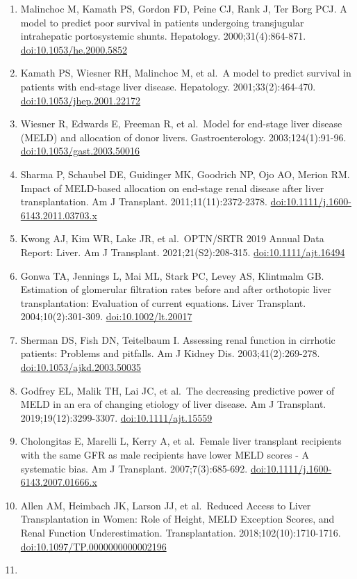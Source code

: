 \documentclass[11pt,english,]{book} %
\begin{document}
\begin{enumerate}
\item
  Malinchoc M, Kamath PS, Gordon FD, Peine CJ, Rank J, Ter Borg PCJ. A model to predict poor survival in patients undergoing transjugular intrahepatic portosystemic shunts. Hepatology. 2000;31(4):864-871. \url{doi:10.1053/he.2000.5852}
\item
  Kamath PS, Wiesner RH, Malinchoc M, et al.~A model to predict survival in patients with end-stage liver disease. Hepatology. 2001;33(2):464-470. \url{doi:10.1053/jhep.2001.22172}
\item
  Wiesner R, Edwards E, Freeman R, et al.~Model for end-stage liver disease (MELD) and allocation of donor livers. Gastroenterology. 2003;124(1):91-96. \url{doi:10.1053/gast.2003.50016}
\item
  Sharma P, Schaubel DE, Guidinger MK, Goodrich NP, Ojo AO, Merion RM. Impact of MELD-based allocation on end-stage renal disease after liver transplantation. Am J Transplant. 2011;11(11):2372-2378. \url{doi:10.1111/j.1600-6143.2011.03703.x}
\item
  Kwong AJ, Kim WR, Lake JR, et al.~OPTN/SRTR 2019 Annual Data Report: Liver. Am J Transplant. 2021;21(S2):208-315. \url{doi:10.1111/ajt.16494}
\item
  Gonwa TA, Jennings L, Mai ML, Stark PC, Levey AS, Klintmalm GB. Estimation of glomerular filtration rates before and after orthotopic liver transplantation: Evaluation of current equations. Liver Transplant. 2004;10(2):301-309. \url{doi:10.1002/lt.20017}
\item
  Sherman DS, Fish DN, Teitelbaum I. Assessing renal function in cirrhotic patients: Problems and pitfalls. Am J Kidney Dis. 2003;41(2):269-278. \url{doi:10.1053/ajkd.2003.50035}
\item
  Godfrey EL, Malik TH, Lai JC, et al.~The decreasing predictive power of MELD in an era of changing etiology of liver disease. Am J Transplant. 2019;19(12):3299-3307. \url{doi:10.1111/ajt.15559}
\item
  Cholongitas E, Marelli L, Kerry A, et al.~Female liver transplant recipients with the same GFR as male recipients have lower MELD scores - A systematic bias. Am J Transplant. 2007;7(3):685-692. \url{doi:10.1111/j.1600-6143.2007.01666.x}
\item
  Allen AM, Heimbach JK, Larson JJ, et al.~Reduced Access to Liver Transplantation in Women: Role of Height, MELD Exception Scores, and Renal Function Underestimation. Transplantation. 2018;102(10):1710-1716. \url{doi:10.1097/TP.0000000000002196}
\item

\end{enumerate}
\end{document}
